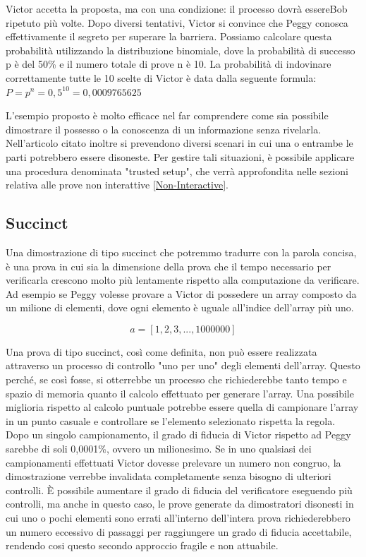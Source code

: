 Victor accetta la proposta, ma con una condizione: il processo dovrà essereBob
ripetuto più volte. Dopo diversi tentativi, Victor si convince che Peggy conosca effettivamente il segreto per superare
la barriera. Possiamo calcolare questa probabilità utilizzando la distribuzione binomiale, dove la probabilità di
successo p è del 50\% e il numero totale di prove n è 10. La probabilità di indovinare correttamente tutte le 10 scelte
di Victor è data dalla seguente formula: \(P = p^n = 0,5^{10} = 0,0009765625\)

L'esempio proposto è molto efficace nel far comprendere come sia possibile dimostrare il possesso o la conoscenza di un
informazione senza rivelarla. Nell’articolo citato inoltre si prevendono diversi scenari in cui una o entrambe le parti
potrebbero essere disoneste. Per gestire tali situazioni, è possibile applicare una procedura denominata "trusted
setup", che verrà approfondita nelle sezioni relativa alle prove non interattive \hyperref[sec:non-interactive]{[Non-Interactive]}.

\subsection{Succinct}
Una dimostrazione di tipo succinct che potremmo tradurre con la parola concisa, è una prova in cui sia la dimensione
della prova che il tempo necessario per verificarla crescono molto più lentamente rispetto alla computazione da
verificare. Ad esempio se Peggy volesse provare a Victor di possedere un array composto da un milione di elementi, dove
ogni elemento è uguale all’indice dell’array più uno.

\begin{equation}
a = [1,2,3,...,1000000]
\end{equation}

Una prova di tipo succinct, così come definita, non può essere realizzata attraverso un processo di controllo "uno per
uno" degli elementi dell'array. Questo perché, se così fosse, si otterrebbe un processo che richiederebbe tanto tempo e
spazio di memoria quanto il calcolo effettuato per generare l'array. Una possibile miglioria rispetto al calcolo puntuale
potrebbe essere quella di campionare l'array in un punto casuale e controllare se l'elemento selezionato rispetta la
regola. \\
Dopo un singolo campionamento, il grado di fiducia di Victor rispetto ad Peggy sarebbe di soli 0,0001\%, ovvero un
milionesimo. Se in uno qualsiasi dei campionamenti effettuati Victor dovesse prelevare un numero non congruo, la
dimostrazione verrebbe invalidata completamente senza bisogno di ulteriori controlli. È possibile aumentare il grado di
fiducia del verificatore eseguendo più controlli, ma anche in questo caso, le prove generate da dimostratori disonesti
in cui uno o pochi elementi sono errati all'interno dell'intera prova richiederebbero un numero eccessivo di passaggi
per raggiungere un grado di fiducia accettabile, rendendo cosi questo secondo approccio fragile e non attuabile.

